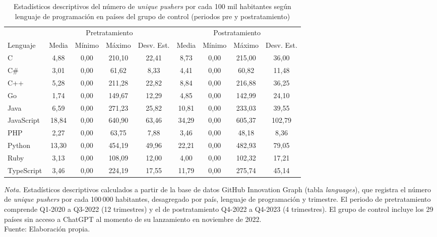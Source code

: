 \documentclass[12pt,a4paper]{article}
\begin{document}
\begin{table}[H]
\centering
\caption{Estadísticos descriptivos del número de \textit{unique pushers} por cada 100 mil habitantes según lenguaje de programación en países del grupo de control (periodos pre y postratamiento)}
\label{tab:tabla1}
\setlength{\tabcolsep}{3pt}\begin{tabular}{lcccccccc}
\toprule
 & \multicolumn{4}{c}{Pretratamiento} & \multicolumn{4}{c}{Postratamiento} \\
\cmidrule(lr){2-5}\cmidrule(lr){6-9}
Lenguaje & Media & Mínimo & Máximo & Desv. Est. & Media & Mínimo & Máximo & Desv. Est. \\
\midrule
C          & 4{,}88  & 0{,}00 & 210{,}10 & 22{,}41 & 8{,}73  & 0{,}00 & 215{,}00 & 36{,}00  \\
C\#        & 3{,}01  & 0{,}00 &  61{,}62 &  8{,}33 & 4{,}41  & 0{,}00 &  60{,}82 & 11{,}48  \\
C++        & 5{,}28  & 0{,}00 & 211{,}28 & 22{,}82 & 8{,}84  & 0{,}00 & 216{,}88 & 36{,}25  \\
Go         & 1{,}74  & 0{,}00 & 149{,}67 & 12{,}29 & 4{,}85  & 0{,}00 & 142{,}99 & 24{,}10  \\
Java       & 6{,}59  & 0{,}00 & 271{,}23 & 25{,}82 & 10{,}81 & 0{,}00 & 233{,}03 & 39{,}55  \\
JavaScript & 18{,}84 & 0{,}00 & 640{,}90 & 63{,}46 & 34{,}29 & 0{,}00 & 605{,}37 & 102{,}79 \\
PHP        & 2{,}27  & 0{,}00 &  63{,}75 &  7{,}88 & 3{,}46  & 0{,}00 &  48{,}18 &  8{,}36  \\
Python     & 13{,}30 & 0{,}00 & 454{,}19 & 49{,}96 & 22{,}21 & 0{,}00 & 482{,}93 & 79{,}05  \\
Ruby       & 3{,}13  & 0{,}00 & 108{,}09 & 12{,}00 & 4{,}00  & 0{,}00 & 102{,}32 & 17{,}21  \\
TypeScript & 3{,}46  & 0{,}00 & 224{,}19 & 17{,}55 & 11{,}79 & 0{,}00 & 275{,}74 & 45{,}14  \\
\bottomrule
\end{tabular}
\begin{minipage}{\linewidth}
\smallskip\footnotesize\textit{Nota.} Estadísticos descriptivos calculados a partir de la base de datos GitHub Innovation Graph (tabla \textit{languages}), que registra el número de \textit{unique pushers} por cada 100\,000 habitantes, desagregado por país, lenguaje de programación y trimestre. El periodo de pretratamiento comprende Q1-2020 a Q3-2022 (12 trimestres) y el de postratamiento Q4-2022 a Q4-2023 (4 trimestres). El grupo de control incluye los 29 países sin acceso a ChatGPT al momento de su lanzamiento en noviembre de 2022.\\[\baselineskip]Fuente: Elaboración propia.
\end{minipage}
\end{table}
\end{document}
